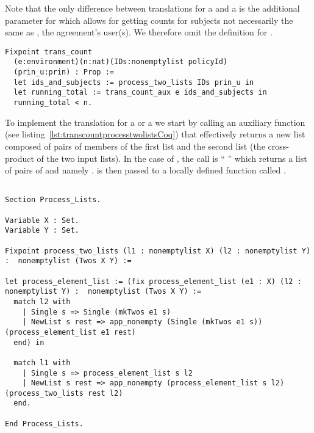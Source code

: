 Note that the only difference between translations for a  and a  is the additional  parameter for  which allows for getting counts for subjects not necessarily the same as , the agreement's user(s). We therefore omit the definition for .


\begin{minipage}[c]{0.95\textwidth}
\begin{lstlisting}
Fixpoint trans_count
  (e:environment)(n:nat)(IDs:nonemptylist policyId)
  (prin_u:prin) : Prop :=
  let ids_and_subjects := process_two_lists IDs prin_u in
  let running_total := trans_count_aux e ids_and_subjects in
  running_total < n.
\end{lstlisting}
\end{minipage}


To implement the translation for a  or a  we start by calling an auxiliary function  (see listing~\ref{lst:transcountprocesstwolistsCoq}) that effectively returns a new list composed of pairs of members of the first list and the second list (the cross-product of the two input lists). In the case of , the call is ``  '' which returns a list of pairs of  and  namely .  is then passed to a locally defined function called .

\begin{lstlisting}

Section Process_Lists.

Variable X : Set.
Variable Y : Set.

Fixpoint process_two_lists (l1 : nonemptylist X) (l2 : nonemptylist Y) :  nonemptylist (Twos X Y) :=

let process_element_list := (fix process_element_list (e1 : X) (l2 : nonemptylist Y) :	nonemptylist (Twos X Y) :=
  match l2 with
    | Single s => Single (mkTwos e1 s)
    | NewList s rest => app_nonempty (Single (mkTwos e1 s)) (process_element_list e1 rest)
  end) in

  match l1 with
    | Single s => process_element_list s l2
    | NewList s rest => app_nonempty (process_element_list s l2) (process_two_lists rest l2)
  end.

End Process_Lists.

\end{lstlisting}


